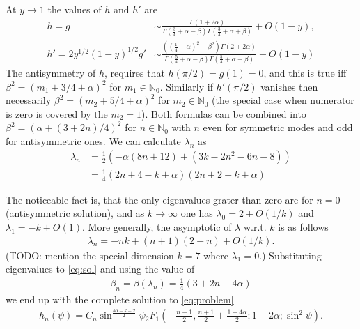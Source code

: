 At $y\rightarrow1$ the values of $h$ and
$h'$ are
\begin{align}
  h=g&
  \sim\frac{\Gamma(1+2\alpha)}{\Gamma\left(\frac{3}{4}+\alpha-\beta\right)\Gamma\left(\frac{3}{4}+\alpha+\beta\right)}+O(1-y),\\
  h'=2y^{1/2}(1-y)^{1/2}g'&
  \sim\frac{\left(\left(\frac{1}{4}+\alpha\right)^2-\beta^2\right)\Gamma(2+2\alpha)}{\Gamma\left(\frac{5}{4}+\alpha-\beta\right)\Gamma\left(\frac{5}{4}+\alpha+\beta\right)}+O(1-y)
\end{align}
The antisymmetry of $h$, requires that $h(\pi/2)=g(1)=0$, and this is
true iff $\beta^2=(m_1+3/4+\alpha)^2$ for
$m_1\in\mathbb{N}_0$. Similarly if $h'(\pi/2)$ vanishes then
necessarily $\beta^2=(m_2+5/4+\alpha)^2$ for $m_2\in\mathbb{N}_0$ (the
special case when numerator is zero is covered by the $m_2=1$). Both
formulas can be combined into $\beta^2=(\alpha+(3+2n)/4)^2$ for
$n\in\mathbb{N}_0$ with $n$ even for symmetric modes and odd for
antisymmetric ones. We can calculate $\lambda_n$ as
\begin{align}
  \lambda_n&=\frac{1}{2}(-\alpha(8n+12)+(3k-2n^2-6n-8))\\
  &=\frac{1}{4}(2n+4-k+\alpha)(2n+2+k+\alpha)
\end{align}

The noticeable fact is, that the only eigenvalues grater than zero are
for $n=0$ (antisymmetric solution), and as $k\rightarrow\infty$ one
has $\lambda_0= 2 + O(1/k)$ and $\lambda_1=-k+O(1)$. More generally,
the asymptotic of $\lambda$ w.r.t. $k$ is as follows
\begin{gather}
  \lambda_n=-nk+(n+1)(2-n)+O(1/k).
\end{gather}
(TODO: mention the special dimension $k=7$ where $\lambda_1=0$.)
Substituting eigenvalues to \eqref{eq:sol} and using the value of
\begin{gather}
  \beta_n=\beta(\lambda_n)=\frac{1}{4}(3+2n+4\alpha)
\end{gather}
we end up with the complete solution to \eqref{eq:problem}
\begin{gather}
  h_n(\psi)=C_n\sin^{\frac{4\alpha-k+2}{2}}\psi {}_2 F_1
  \left(-\frac{n+1}{2},\frac{n+1}{2}+\frac{1+4\alpha}{2};1+2\alpha;\sin^2\psi\right).
\end{gather}



